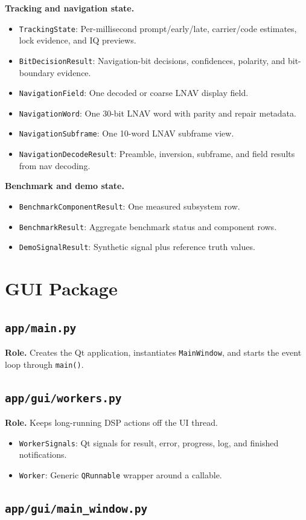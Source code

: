 \documentclass[11pt,a4paper]{article}
\newcommand{\codepath}[1]{\nolinkurl{#1}}
\newcommand{\codeheading}[1]{\texorpdfstring{\codepath{#1}}{#1}}
\newcommand{\codesym}[1]{\nolinkurl{#1}}
\newcommand{\apiitem}[2]{\item \codesym{#1}: #2}
\begin{document}
\textbf{Tracking and navigation state.}
\begin{itemize}
  \apiitem{TrackingState}{Per-millisecond prompt/early/late, carrier/code estimates, lock evidence, and IQ previews.}
  \apiitem{BitDecisionResult}{Navigation-bit decisions, confidences, polarity, and bit-boundary evidence.}
  \apiitem{NavigationField}{One decoded or coarse LNAV display field.}
  \apiitem{NavigationWord}{One 30-bit LNAV word with parity and repair metadata.}
  \apiitem{NavigationSubframe}{One 10-word LNAV subframe view.}
  \apiitem{NavigationDecodeResult}{Preamble, inversion, subframe, and field results from nav decoding.}
\end{itemize}

\textbf{Benchmark and demo state.}
\begin{itemize}
  \apiitem{BenchmarkComponentResult}{One measured subsystem row.}
  \apiitem{BenchmarkResult}{Aggregate benchmark status and component rows.}
  \apiitem{DemoSignalResult}{Synthetic signal plus reference truth values.}
\end{itemize}

\section{GUI Package}

\subsection{\codeheading{app/main.py}}

\textbf{Role.} Creates the Qt application, instantiates \texttt{MainWindow}, and starts the event loop through \texttt{main()}.

\subsection{\codeheading{app/gui/workers.py}}

\textbf{Role.} Keeps long-running DSP actions off the UI thread.

\begin{itemize}
  \apiitem{WorkerSignals}{Qt signals for result, error, progress, log, and finished notifications.}
  \apiitem{Worker}{Generic \texttt{QRunnable} wrapper around a callable.}
\end{itemize}

\subsection{\codeheading{app/gui/main_window.py}}
\end{document}
